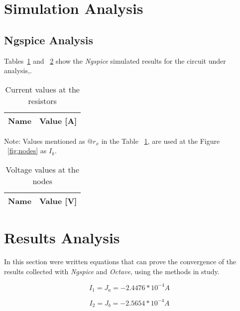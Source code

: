 \section{Simulation Analysis}
\label{sec:simulation}

\subsection{Ngspice Analysis}

Tables~\ref{tab:op_amp_tab} and ~\ref{tab:op_volt_tab} show the \textit{Ngspice} simulated results for the circuit
under analysis,. 

\begin{table}[ht]
  \centering
  \begin{tabular}{|l|r|}
    \hline    
    {\bf Name} & {\bf Value [A]} \\ \hline
    
  \end{tabular}
  \caption{Current values at the resistors}
  \label{tab:op_amp_tab}
\end{table}

\vspace{5mm}

Note: Values mentioned as $@r_x$ in the Table
~\ref{tab:op_amp_tab}, are used at the Figure ~\ref{fig:nodes} as $I_k$.

\begin{table}[ht]
  \centering
  \begin{tabular}{|l|r|}
    \hline    
    {\bf Name} & {\bf Value [V]} \\ \hline
    
  \end{tabular}
  \caption{Voltage values at the nodes}
  \label{tab:op_volt_tab}
\end{table}

\newpage

\section{Results Analysis}
\label{sec:resultsanalysis}

In this section were written equations that can prove the convergence of the results collected with \textit{Ngspice} and \textit{Octave}, using the methods in study.

\begin{equation}
  I_1 = J_a = - 2.4476*10^{-4} A
  \label{i1}
\end{equation}


\begin{equation}
  I_2 = J_b = - 2.5654*10^{-4} A
  \label{i2}
\end{equation}


